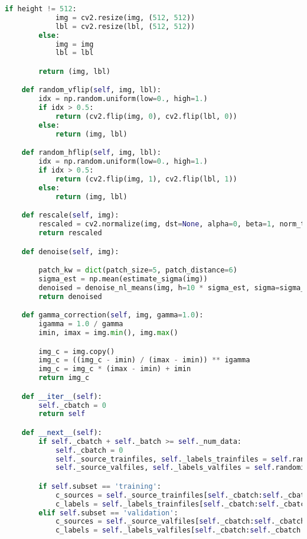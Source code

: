 \documentclass{standalone}
\begin{document}
\begin{lstlisting}[language = python, caption=Custom $\mathtt{DataGenerator}$ implementation]
        if height != 512:
            img = cv2.resize(img, (512, 512))
            lbl = cv2.resize(lbl, (512, 512))
        else:
            img = img
            lbl = lbl

        return (img, lbl)

    def random_vflip(self, img, lbl):
        idx = np.random.uniform(low=0., high=1.)
        if idx > 0.5:
            return (cv2.flip(img, 0), cv2.flip(lbl, 0))
        else:
            return (img, lbl)

    def random_hflip(self, img, lbl):
        idx = np.random.uniform(low=0., high=1.)
        if idx > 0.5:
            return (cv2.flip(img, 1), cv2.flip(lbl, 1))
        else:
            return (img, lbl)

    def rescale(self, img):
        rescaled = cv2.normalize(img, dst=None, alpha=0, beta=1, norm_type=cv2.NORM_MINMAX, dtype=cv2.CV_32F)
        return rescaled

    def denoise(self, img):

        patch_kw = dict(patch_size=5, patch_distance=6)
        sigma_est = np.mean(estimate_sigma(img))
        denoised = denoise_nl_means(img, h=10 * sigma_est, sigma=sigma_est, fast_mode=True, **patch_kw)
        return denoised

    def gamma_correction(self, img, gamma=1.0):
        igamma = 1.0 / gamma
        imin, imax = img.min(), img.max()

        img_c = img.copy()
        img_c = ((img_c - imin) / (imax - imin)) ** igamma
        img_c = img_c * (imax - imin) + imin
        return img_c

    def __iter__(self):
        self._cbatch = 0
        return self

    def __next__(self):
        if self._cbatch + self._batch >= self._num_data:
            self._cbatch = 0
            self._source_trainfiles, self._labels_trainfiles = self.randomize(self._source_trainfiles, self._labels_trainfiles)
            self._source_valfiles, self._labels_valfiles = self.randomize(self._source_valfiles, self._labels_valfiles)

        if self.subset == 'training':
            c_sources = self._source_trainfiles[self._cbatch:self._cbatch + self._batch]
            c_labels = self._labels_trainfiles[self._cbatch:self._cbatch + self._batch]
        elif self.subset == 'validation':
            c_sources = self._source_valfiles[self._cbatch:self._cbatch + self._batch]
            c_labels = self._labels_valfiles[self._cbatch:self._cbatch + self._batch]


\end{lstlisting}
\end{document}
